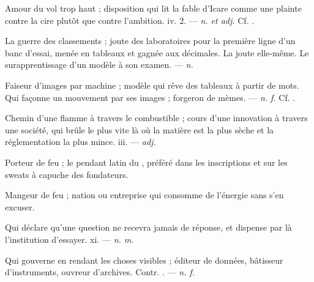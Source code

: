  Amour du vol trop haut ; disposition qui lit la fable d'Icare comme une plainte contre la cire plutôt que contre l'ambition.   iv. 2. ---  \textit{n. et adj.} Cf. .

 La guerre des classements ; joute des laboratoires pour la première ligne d'un banc d'essai, menée en tableaux et gagnée aux décimales.  La joute elle-même.   Le surapprentissage d'un modèle à son examen.   ---  \textit{n.}

  Faiseur d'images par machine ; modèle qui rêve des tableaux à partir de mots.   Qui façonne un mouvement par ses images ; forgeron de mèmes. ---  \textit{n. f.} Cf. .

 Chemin d'une flamme à travers le combustible ;  cours d'une innovation à travers une société, qui brûle le plus vite là où la matière est la plus sèche et la réglementation la plus mince.   iii. ---  \textit{adj.}

 Porteur de feu ; le pendant latin du , préféré dans les inscriptions et sur les sweats à capuche des fondateurs.

 Mangeur de feu ; nation ou entreprise qui consomme de l'énergie sans s'en excuser.

 Qui déclare qu'une question ne recevra jamais de réponse, et dispense par là l'institution d'essayer.   xi. ---  \textit{n. m.}

 Qui gouverne en rendant les choses visibles ; éditeur de données, bâtisseur d'instruments, ouvreur d'archives. Contr. . ---  \textit{n. f.}

